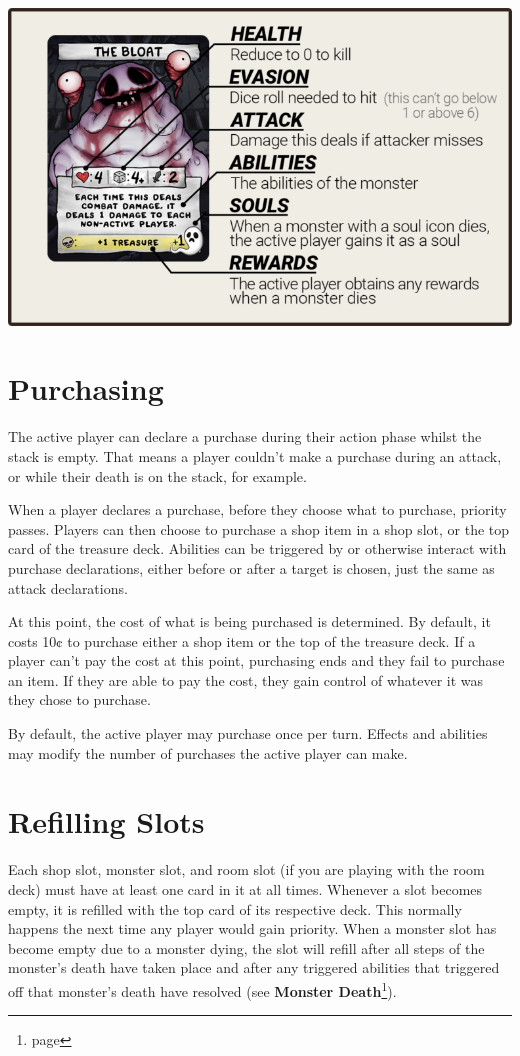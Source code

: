 \documentclass[a4paper, twoside]{report} %
\begin{document}
    \includegraphics[width=\textwidth]{assets/Monster-Stat-Breakdown-768x484.png}

    \chapter{Purchasing}
    \label{purchasing}
    The active player can declare a purchase during their action phase whilst the stack is empty. That means a player couldn’t make a purchase during an attack, or while their death is on the stack, for example.

    When a player declares a purchase, before they choose what to purchase, priority passes. Players can then choose to purchase a shop item in a shop slot, or the top card of the treasure deck. Abilities can be triggered by or otherwise interact with purchase declarations, either before or after a target is chosen, just the same as attack declarations.

    At this point, the cost of what is being purchased is determined. By default, it costs 10¢ to purchase either a shop item or the top of the treasure deck. If a player can’t pay the cost at this point, purchasing ends and they fail to purchase an item. If they are able to pay the cost, they gain control of whatever it was they chose to purchase.

    By default, the active player may purchase once per turn. Effects and abilities may modify the number of purchases the active player can make.

    \chapter{Refilling Slots}
    \label{refilling}
    Each shop slot, monster slot, and room slot (if you are playing with the room deck) must have at least one card in it at all times. Whenever a slot becomes empty, it is refilled with the top card of its respective deck. This normally happens the next time any player would gain priority. When a monster slot has become empty due to a monster dying, the slot will refill after all steps of the monster’s death have taken place and after any triggered abilities that triggered off that monster’s death have resolved (see \textbf{Monster Death}\footnote{page \pageref{monsterdeath}}).
\end{document}
